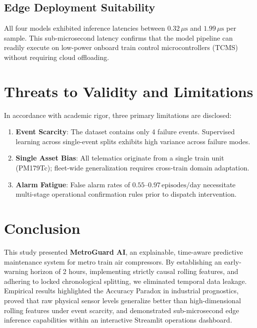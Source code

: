 \documentclass[10pt,twocolumn,a4paper]{article}
\begin{document}
\subsection{Edge Deployment Suitability}
All four models exhibited inference latencies between $0.32\,\mu\text{s}$ and $1.99\,\mu\text{s}$ per sample. This sub-microsecond latency confirms that the model pipeline can readily execute on low-power onboard train control microcontrollers (TCMS) without requiring cloud offloading.

\section{Threats to Validity and Limitations}
In accordance with academic rigor, three primary limitations are disclosed:
\begin{enumerate}
    \item \textbf{Event Scarcity}: The dataset contains only 4 failure events. Supervised learning across single-event splits exhibits high variance across failure modes.
    \item \textbf{Single Asset Bias}: All telematics originate from a single train unit (PM179Tc); fleet-wide generalization requires cross-train domain adaptation.
    \item \textbf{Alarm Fatigue}: False alarm rates of $0.55$--$0.97\,\text{episodes/day}$ necessitate multi-stage operational confirmation rules prior to dispatch intervention.
\end{enumerate}

\section{Conclusion}
This study presented \textbf{MetroGuard AI}, an explainable, time-aware predictive maintenance system for metro train air compressors. By establishing an early-warning horizon of 2 hours, implementing strictly causal rolling features, and adhering to locked chronological splitting, we eliminated temporal data leakage. Empirical results highlighted the Accuracy Paradox in industrial prognostics, proved that raw physical sensor levels generalize better than high-dimensional rolling features under event scarcity, and demonstrated sub-microsecond edge inference capabilities within an interactive Streamlit operations dashboard.
\end{document}
